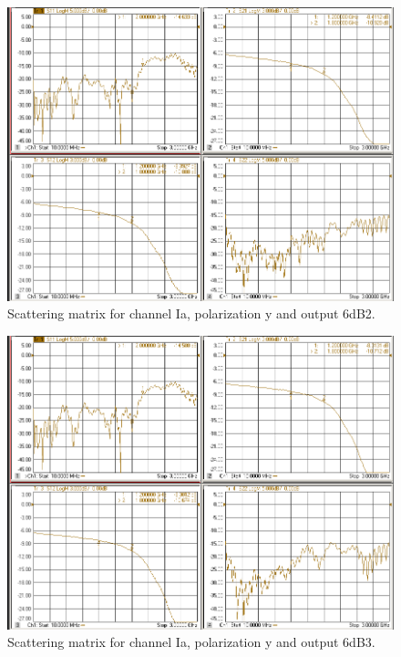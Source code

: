 \documentclass[12pt,a4paper,oneside]{article}
\begin{document}
\begin{figure}[H]
\centering
\includegraphics[width=0.9\linewidth]{VNA_results/Iay_6dB2.png}
\caption{Scattering matrix for channel Ia, polarization y and output 6dB2.}
\label{fig:Iay_6dB2}
\end{figure}


\begin{figure}[H]
\centering
\includegraphics[width=0.9\linewidth]{VNA_results/Iay_6dB3.png}
\caption{Scattering matrix for channel Ia, polarization y and output 6dB3.}
\label{fig:Iay_6dB3}
\end{figure}
\end{document}
